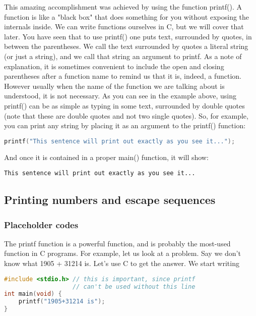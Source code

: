 This amazing accomplishment was achieved by using the function printf(). A
function is like a "black box" that does something for you without exposing the
internals inside. We can write functions ourselves in C, but we will cover that
later.  You have seen that to use printf() one puts text, surrounded by quotes,
in between the parentheses. We call the text surrounded by quotes a literal
string (or just a string), and we call that string an argument to printf.  As a
note of explanation, it is sometimes convenient to include the open and closing
parentheses after a function name to remind us that it is, indeed, a function.
However usually when the name of the function we are talking about is
understood, it is not necessary.  As you can see in the example above, using
printf() can be as simple as typing in some text, surrounded by double quotes
(note that these are double quotes and not two single quotes). So, for example,
you can print any string by placing it as an argument to the printf() function:
\lstset{basicstyle=\scriptsize, numbers=left, captionpos=b, tabsize=4}
\begin{lstlisting}[caption=Section \thesection listing \arabic{inout},language={C},
breaklines=true,xleftmargin=15pt,label=lst:section\thesection listing\arabic{inout}]
printf("This sentence will print out exactly as you see it...");
\end{lstlisting}

And once it is contained in a proper main() function, it will show:
\scriptsize
\begin{verbatim}
This sentence will print out exactly as you see it...
\end{verbatim}
\normalsize

\subsection{Printing numbers and escape sequences}
\subsubsection{Placeholder codes}
The printf function is a powerful function, and is probably the most-used
function in C programs.  For example, let us look at a problem. Say we don't
know what 1905 + 31214 is. Let's use C to get the answer.  We start writing
\lstset{basicstyle=\scriptsize, numbers=left, captionpos=b, tabsize=4}
\begin{lstlisting}[caption=Section \thesection listing \arabic{inout},language={C},
breaklines=true,xleftmargin=15pt,label=lst:section\thesection listing\arabic{inout}]
#include <stdio.h> // this is important, since printf 
                   // can't be used without this line
int main(void) {
	printf("1905+31214 is");
}
\end{lstlisting}

